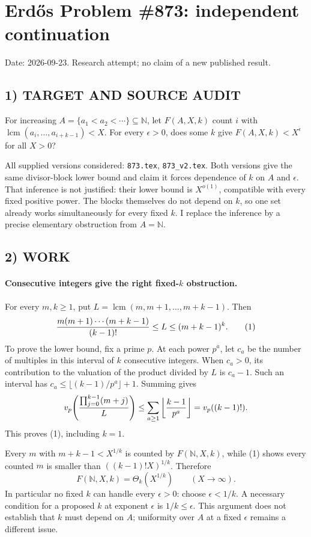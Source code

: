 \section{Erd\H{o}s Problem \#873: independent continuation}
\noindent Date: 2026-09-23. Research attempt; no claim of a new published result.
\subsection{1) TARGET AND SOURCE AUDIT}
For increasing $A=\{a_1<a_2<\cdots\}\subseteq\mathbb N$, let $F(A,X,k)$ count $i$ with $\operatorname{lcm}(a_i,\ldots,a_{i+k-1})<X$. For every $\epsilon>0$, does some $k$ give $F(A,X,k)<X^\epsilon$ for all $X>0$?

All supplied versions considered: \texttt{873.tex}, \texttt{873\_v2.tex}.
Both versions give the same divisor-block lower bound and claim it forces dependence of $k$ on $A$ and $\epsilon$. That inference is not justified: their lower bound is $X^{o(1)}$, compatible with every fixed positive power. The blocks themselves do not depend on $k$, so one set already works simultaneously for every fixed $k$. I replace the inference by a precise elementary obstruction from $A=\mathbb N$.
\subsection{2) WORK}
\paragraph{Consecutive integers give the right fixed-$k$ obstruction.}
For every $m,k\ge1$, put $L=\operatorname{lcm}(m,m+1,\ldots,m+k-1)$. Then
\[
{m(m+1)\cdots(m+k-1)\over(k-1)!}\le L\le(m+k-1)^k. \tag{1}
\]
To prove the lower bound, fix a prime $p$. At each power $p^a$, let $c_a$ be the number of multiples in this interval of $k$ consecutive integers. When $c_a>0$, its contribution to the valuation of the product divided by $L$ is $c_a-1$. Such an interval has $c_a\le\lfloor(k-1)/p^a\rfloor+1$. Summing gives
\[
v_p\!\left({\prod_{j=0}^{k-1}(m+j)\over L}\right)
\le\sum_{a\ge1}\left\lfloor{k-1\over p^a}\right\rfloor=v_p((k-1)!).
\]
This proves (1), including $k=1$.

Every $m$ with $m+k-1<X^{1/k}$ is counted by $F(\mathbb N,X,k)$, while (1) shows every counted $m$ is smaller than $((k-1)!X)^{1/k}$. Therefore
\[
F(\mathbb N,X,k)=\Theta_k(X^{1/k})\qquad(X\to\infty).
\]
In particular no fixed $k$ can handle every $\epsilon>0$: choose $\epsilon<1/k$. A necessary condition for a proposed $k$ at exponent $\epsilon$ is $1/k\le\epsilon$. This argument does not establish that $k$ must depend on $A$; uniformity over $A$ at a fixed $\epsilon$ remains a different issue.

